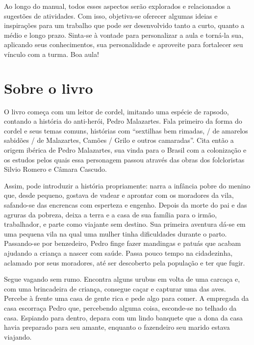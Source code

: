 \documentclass[11pt]{extarticle}
\begin{document}
Ao longo do manual, todos esses aspectos serão explorados e relacionados a sugestões de atividades. Com isso, objetiva-se oferecer algumas ideias e inspirações para um trabalho que pode ser desenvolvido tanto a curto, quanto a médio e longo prazo. Sinta-se à vontade para personalizar a aula e torná-la sua, aplicando seus conhecimentos, sua 
personalidade e aproveite para fortalecer seu vínculo com a turma.
Boa aula!


\section{Sobre o livro}
O livro começa com um leitor de cordel, imitando uma espécie de rapsodo, contando a história do anti-herói, Pedro Malazartes. Fala primeiro da forma do cordel e seus temas comuns, histórias com ``sextilhas bem rimadas, / de amarelos sabidões / de Malazartes, Camões / Grilo e outros camaradas''. Cita então a origem ibérica de Pedro Malazartes, sua vinda para o Brasil com a colonização e os estudos pelos quais essa personagem passou através das obras dos folcloristas Silvio Romero e Câmara Cascudo.

Assim, pode introduzir a história propriamente: narra a infância pobre do menino que, desde pequeno, gostava de vadear e aprontar com os moradores da vila, safando-se das encrencas com esperteza e engenho.
Depois da morte do pai e das agruras da pobreza, deixa a terra e a casa de sua família para o irmão, trabalhador, e parte como viajante sem destino.
Sua primeira aventura dá-se em uma pequena vila na qual uma mulher tinha dificuldades durante o parto. Passando-se por benzedeiro, Pedro finge fazer mandingas e patuás que acabam ajudando a criança a nascer com saúde. Passa pouco tempo na cidadezinha, aclamado por seus moradores, até ser descoberto pela população e ter que fugir.

Segue vagando sem rumo. Encontra alguns urubus em volta de uma carcaça e, com uma brincadeira de criança, consegue caçar e capturar uma das aves. Percebe à frente uma casa de gente rica e pede algo para comer. A empregada da casa escorraça Pedro que, percebendo alguma coisa, esconde-se no telhado da casa. Espiando para dentro, depara com um lindo banquete que a dona da casa havia preparado para seu amante, enquanto o fazendeiro seu marido estava viajando. 
\end{document}

